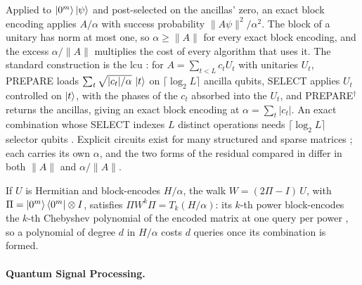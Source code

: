 Applied to $\ket{0^m}\ket{\psi}$ and post-selected on the ancillas' zero, an exact block encoding applies $A/\alpha$ with success probability $\|A\psi\|^2/\alpha^2$. The block of a unitary has norm at most one, so $\alpha\ge\|A\|$ for every exact block encoding, and the excess $\alpha/\|A\|$ multiplies the cost of every algorithm that uses it. The standard construction is the \gls{lcu} \cite{childs2012lcu}: for $A=\sum_{t<L}c_tU_t$ with unitaries $U_t$, PREPARE loads $\sum_t\sqrt{|c_t|/\alpha}\,\ket{t}$ on $\lceil\log_2L\rceil$ ancilla qubits, SELECT applies $U_t$ controlled on $\ket{t}$, with the phases of the $c_t$ absorbed into the $U_t$, and PREPARE$^\dagger$ returns the ancillas, giving an exact block encoding at $\alpha=\sum_t|c_t|$. An exact combination whose SELECT indexes $L$ distinct operations needs $\lceil\log_2L\rceil$ selector qubits \cite{chakraborty2025qsvt}. Explicit circuits exist for many structured and sparse matrices \cite{camps2024explicit,sunderhauf2024blockencoding}; each carries its own $\alpha$, and the two forms of the residual compared in  differ in both $\|A\|$ and $\alpha/\|A\|$.

If $U$ is Hermitian and block-encodes $H/\alpha$, the walk $W=(2\Pi-I)\,U$, with $\Pi=\ket{0^m}\bra{0^m}\otimes I$, satisfies $\Pi W^k\Pi=T_k(H/\alpha)$: its $k$-th power block-encodes the $k$-th Chebyshev polynomial of the encoded matrix at one query per power \cite{lowchuang2019qubitization}, so a polynomial of degree $d$ in $H/\alpha$ costs $d$ queries once its combination is formed.

\paragraph{Quantum Signal Processing.}
\label{sec:bg-qsp}

